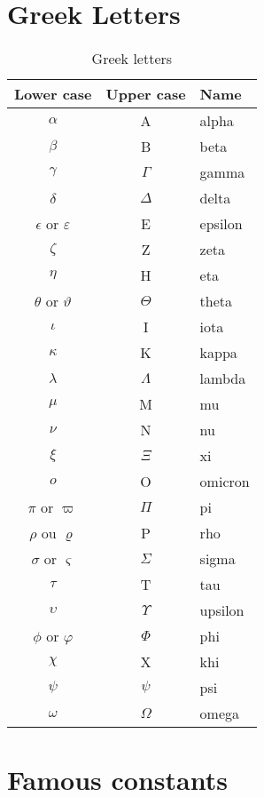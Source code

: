 \section{Greek Letters}
\begin{table}[h!]
	\centering
	\begin{tabular}{|c|c|l|}
		\hline 
		\textbf{Lower case}&\textbf{Upper case}&\textbf{Name}\\
		\hline
	    \hline
		$\alpha$ & A & alpha\\ 
		\hline
		$\beta$ & B & beta\\ 
		\hline
		$\gamma$ & $\Gamma$ & gamma\\ 
		\hline
		$\delta$ &$\Delta$ & delta\\ 
		\hline
		$\epsilon$ or $\varepsilon$ & E & epsilon\\ 
		\hline
		$\zeta$ & Z & zeta\\ 
		\hline
		$\eta$ & H & eta\\ 
		\hline
		$\theta$ or $\vartheta$ &$\Theta$ & theta\\ 
		\hline
		$\iota$ &I& iota\\ 
		\hline
		$\kappa$ &K& kappa \\ 
		\hline
		$\lambda$& $\Lambda$ & lambda\\ 
		\hline	
		$\mu$ &M& mu \\ 
		\hline
		$\nu$ &N& nu \\ 
		\hline
		$\xi$ &$\Xi$ & xi \\ 
		\hline
		$o$ & O& omicron \\ 
		\hline
		$\pi$ or $\varpi$&$\Pi$ & pi\\ 
		\hline
		$\rho$ ou $\varrho$ &P& rho\\ 
		\hline
		$\sigma$ or $\varsigma$& $\Sigma$ & sigma\\ 
		\hline
		$\tau$ &T& tau\\ 
		\hline
		$\upsilon$& $\Upsilon$ & upsilon\\ 
		\hline
		$\phi$ or $\varphi$ &$\Phi$& phi\\ 
		\hline
		$\chi$ &X& khi\\ 
		\hline
		$\psi$ &$\psi$& psi\\ 
		\hline
		$\omega$ & $\Omega$ & omega\\ 
		\hline
	 \end{tabular}	
	\caption{Greek letters}
	\label{table:greek_letters}
\end{table}

\section{Famous constants}
